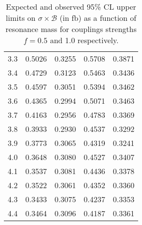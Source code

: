 \begin{table}[h!]
\begin{center}
\begin{tabular}{c||cc||cc}
3.3 & 0.5026  & 0.3255 &  0.5708 &  0.3871 \\
3.4 & 0.4729  & 0.3123 &  0.5463 &  0.3436 \\
3.5 & 0.4597  & 0.3051 &  0.5394 &  0.3462 \\
3.6 & 0.4365  & 0.2994 &  0.5071 &  0.3463 \\
3.7 & 0.4163  & 0.2956 &  0.4783 &  0.3369 \\
3.8 & 0.3933  & 0.2930 &  0.4537 &  0.3292 \\
3.9 & 0.3773  & 0.3065 &  0.4319 &  0.3241 \\
4.0 & 0.3648  & 0.3080 &  0.4527 &  0.3407 \\
4.1 & 0.3537  & 0.3081 &  0.4436 &  0.3378 \\
4.2 & 0.3522  & 0.3061 &  0.4352 &  0.3360 \\
4.3 & 0.3433  & 0.3075 &  0.4237 &  0.3353 \\
4.4 & 0.3464  & 0.3096 &  0.4187 &  0.3361 \\
\hline
\end{tabular}
\caption{Expected and observed 95\% CL upper limits on $\sigma\times\mathcal{B}$ (in fb) as a function of resonance mass for couplings strengths $f=0.5$ and 1.0 respectively.}
   \label{Table:ObsLimits}
\end{center}
\end{table}
